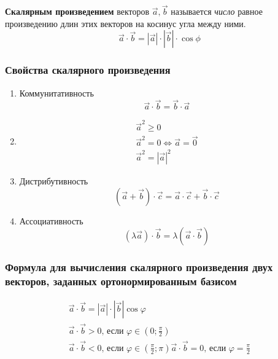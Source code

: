 \begin{definition}
  \textbf{Скалярным произведением} векторов $\vec{a}, \vec{b}$ называется \textit{число}  равное произведению длин этих векторов на косинус угла между ними.\[
  \vec{a} \cdot \vec{b} = |\vec{a}| \cdot |\vec{b}| \cdot \cos \phi
  \] 
\end{definition}

\subsubsection{Свойства скалярного произведения}

\begin{enumerate}
  \item Коммунитативность \[
    \vec{a} \cdot \vec{b} = \vec{b} \cdot \vec{a}
  \] 
\item
  \begin{gather*}
    \vec{a}^2 \ge 0 \\
    \vec{a}^2 = 0 \iff \vec{a} = \vec{0} \\
    \vec{a}^2 = |\vec{a}|^2
  \end{gather*}
  \item Дистрибутивность \[
      \left( \vec{a} + \vec{b} \right) \cdot \vec{c} = \vec{a} \cdot \vec{c} + \vec{b} \cdot \vec{c}
  \]
  \item Ассоциативность \[
    \left( \lambda \vec{a} \right) \cdot \vec{b} = \lambda \left( \vec{a} \cdot \vec{b} \right) 
  \]
\end{enumerate}

\subsubsection{Формула для вычисления скалярного произведения двух векторов, заданных ортонормированным базисом}

\begin{gather*}
  \vec{a} \cdot \vec{b} = |\vec{a}| \cdot |\vec{b}| \cos \varphi \\
  \vec{a} \cdot \vec{b} > 0 \text{, если } \varphi \in \left( 0; \frac{\pi}{2} \right)  \\
  \vec{a} \cdot \vec{b} < 0 \text{, если } \varphi \in \left( \frac{\pi}{2}; \pi \right) 
  \vec{a} \cdot \vec{b} = 0 \text{, если } \varphi = \frac{\pi}{2}
\end{gather*}

